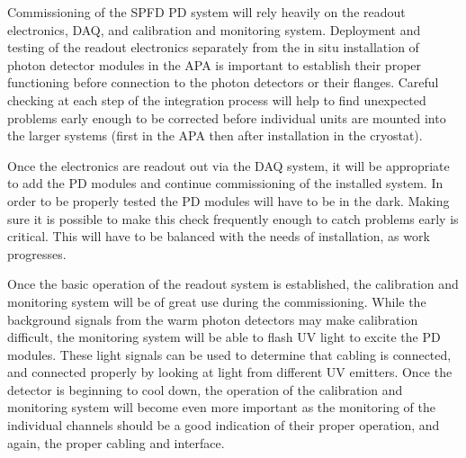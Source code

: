 
Commissioning of the SPFD PD system will rely heavily on the readout electronics, DAQ, and calibration and monitoring system.  Deployment and testing of the readout electronics separately from the in situ installation of photon detector modules in the APA is important to establish their proper functioning before connection to the photon detectors or their flanges.  Careful checking at each step of the integration process will help to find unexpected problems early enough to be corrected before individual units are mounted into the larger systems (first in the APA then after installation in the cryostat). 

Once the electronics are readout out via the DAQ system, it will be appropriate to add the PD modules and continue commissioning of the installed system.  In order to be properly tested the PD modules will have to be in the dark.  Making sure it is possible to make this check frequently enough to catch problems early is critical. This will have to be balanced with the needs of installation, as work progresses.  

Once the basic operation of the readout system is established, the calibration and monitoring system will be of great use during the commissioning.  While the background signals from the warm photon detectors may make calibration difficult, the monitoring system will be able to flash UV light to excite the PD modules.  These light signals can be used to determine that cabling is connected, and connected properly by looking at light from different UV emitters.  Once the detector is beginning to cool down, the operation of the calibration and monitoring system will become even more important as the monitoring of the individual channels should be a good indication of their proper operation, and again, the proper cabling and interface.


%

